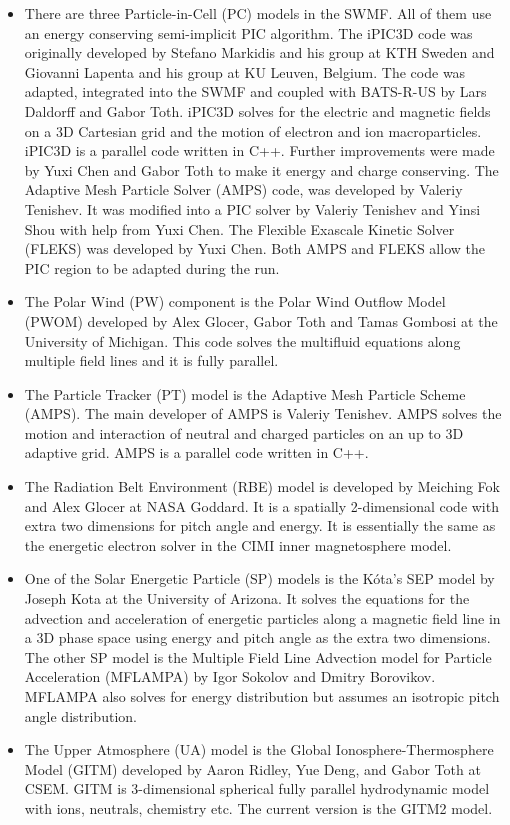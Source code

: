\begin{itemize}
\item
There are three Particle-in-Cell (PC) models in the SWMF. 
All of them use an energy conserving semi-implicit PIC algorithm.
The iPIC3D code was originally developed by Stefano Markidis and his group at KTH Sweden
and Giovanni Lapenta and his group at KU Leuven, Belgium.
The code was adapted, integrated into the SWMF and coupled
with BATS-R-US by Lars Daldorff and Gabor Toth. 
iPIC3D solves for the electric and magnetic fields on 
a 3D Cartesian grid and the motion of electron and ion
macroparticles. iPIC3D is a parallel code written in C++. 
Further improvements were made by Yuxi Chen and Gabor Toth 
to make it energy and charge conserving.
The Adaptive Mesh Particle Solver (AMPS) code, was developed by 
Valeriy Tenishev. It was modified into a PIC solver by Valeriy Tenishev
and Yinsi Shou with help from Yuxi Chen. The Flexible Exascale Kinetic
Solver (FLEKS) was developed by Yuxi Chen. Both AMPS and FLEKS allow
the PIC region to be adapted during the run.

\item
The Polar Wind (PW) component is the Polar Wind Outflow Model (PWOM)
developed by Alex Glocer, Gabor Toth and Tamas Gombosi
at the University of Michigan.  This code solves the
multifluid equations along multiple field lines and it is fully parallel.

\item
The Particle Tracker (PT) model is the Adaptive Mesh Particle Scheme (AMPS).
The main developer of AMPS is Valeriy Tenishev. AMPS solves the motion
and interaction of neutral and charged particles on an up to 3D 
adaptive grid. AMPS is a parallel code written in C++.

\item
The Radiation Belt Environment (RBE) model is developed by Meiching Fok
and Alex Glocer at NASA Goddard. It is a spatially 2-dimensional code with 
extra two dimensions for pitch angle and energy. It is essentially the
same as the energetic electron solver in the CIMI inner magnetosphere model.

\item
One of the Solar Energetic Particle (SP) models is the
K\'ota's SEP model by Joseph Kota at the University of Arizona.
It solves the equations for the advection and acceleration of
energetic particles along a magnetic field line in a 3D phase space
using energy and pitch angle as the extra two dimensions.
The other SP model is the Multiple Field Line Advection model for 
Particle Acceleration (MFLAMPA) by Igor Sokolov and Dmitry Borovikov. 
MFLAMPA also solves
for energy distribution but assumes an isotropic pitch angle distribution.

\item
The Upper Atmosphere (UA) model is the 
Global Ionosphere-Thermosphere Model (GITM) 
developed by Aaron Ridley, Yue Deng, and Gabor Toth at CSEM.
GITM is 3-dimensional spherical
fully parallel hydrodynamic model with ions, neutrals, chemistry etc.
The current version is the GITM2 model.

\end{itemize}
